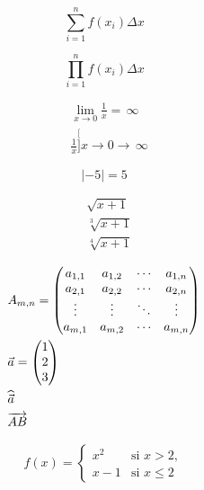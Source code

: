 \begin{equation*}
	\sum_{i=1}^n f(x_i) \Delta x
\end{equation*}

\begin{equation*}
	\prod_{i=1}^n f(x_i) \Delta x
\end{equation*}

\begin{align*}
	&\lim_{x \to 0} \frac{1}{x} = \,\infty \\ 
        &\frac{1}{x}\stackrel[] {x \to 0}{\longrightarrow}\,\infty
\end{align*}

\begin{equation*}
	\lvert -5 \rvert=5
\end{equation*}

\begin{align*}
	&\sqrt{x+1}\\
        &\sqrt[3]{x+1}\\
        &\sqrt[4]{x+1}
\end{align*}

\begin{align*}\centering
        &    A_{m,n} = 
            \begin{pmatrix}
                a_{1,1} & a_{1,2} & \cdots & a_{1,n} \\
                a_{2,1} & a_{2,2} & \cdots & a_{2,n} \\
                \vdots  & \vdots  & \ddots & \vdots  \\
                a_{m,1} & a_{m,2} & \cdots & a_{m,n} 
            \end{pmatrix}\\
        &\vec{a} =
            \begin{pmatrix} 
                1\\2\\3 
            \end{pmatrix}\\
        &\widehat{\vec{a}}\\
        &\overrightarrow{AB}
\end{align*}

\begin{equation*}
	f(x) = \begin{cases}
	x^2 & \text{si } x>2,\\
	x-1 & \text{si } x\leq 2
	\end{cases}
\end{equation*}

